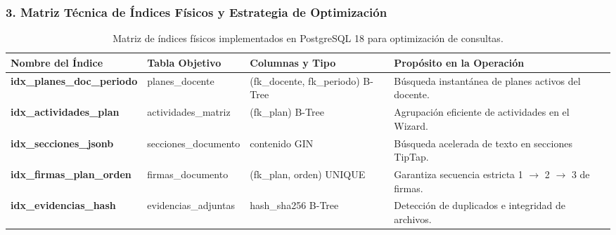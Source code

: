 \documentclass[12pt,a4paper]{article}
\begin{document}
\subsubsection*{3. Matriz Técnica de Índices Físicos y Estrategia de Optimización}
\begin{table}[H]
\centering
\small
\renewcommand{\arraystretch}{1.2}
\begin{tabularx}{\textwidth}{|>{\hsize=1.2\hsize\raggedright\arraybackslash\bfseries\footnotesize}X|>{\hsize=0.85\hsize\raggedright\arraybackslash\footnotesize}X|>{\hsize=0.95\hsize\raggedright\arraybackslash\footnotesize}X|>{\hsize=1.0\hsize\raggedright\arraybackslash\footnotesize}X|}
\hline
\rowcolor{tableheader}
\textbf{Nombre del Índice} & \textbf{Tabla Objetivo} & \textbf{Columnas y Tipo} & \textbf{Propósito en la Operación} \\
\hline
idx\_planes\_doc\_periodo & planes\_docente & (fk\_docente, fk\_periodo) B-Tree & Búsqueda instantánea de planes activos del docente. \\
\hline
idx\_actividades\_plan & actividades\_matriz & (fk\_plan) B-Tree & Agrupación eficiente de actividades en el Wizard. \\
\hline
idx\_secciones\_jsonb & secciones\_documento & contenido GIN & Búsqueda acelerada de texto en secciones TipTap. \\
\hline
idx\_firmas\_plan\_orden & firmas\_documento & (fk\_plan, orden) UNIQUE & Garantiza secuencia estricta 1 $\to$ 2 $\to$ 3 de firmas. \\
\hline
idx\_evidencias\_hash & evidencias\_adjuntas & hash\_sha256 B-Tree & Detección de duplicados e integridad de archivos. \\
\hline
\end{tabularx}
\caption{Matriz de índices físicos implementados en PostgreSQL 18 para optimización de consultas.}
\end{table}
\end{document}
